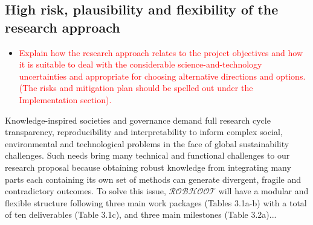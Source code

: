 \documentclass[11pt, a4paper]{article} %
\begin{document}

\subsection{High risk, plausibility and flexibility of the research approach}


\begin{itemize}
\item \textcolor{red}{Explain how the research approach relates to the
    project objectives and how it is suitable to deal with the
    considerable science-and-technology uncertainties and appropriate
    for choosing alternative directions and options. (The risks and
    mitigation plan should be spelled out under the Implementation
    section).}
\end{itemize}

Knowledge-inspired societies and governance demand full research cycle
transparency, reproducibility and interpretability to inform complex
social, environmental and technological problems in the face of global
sustainability challenges. Such needs bring many technical and
functional challenges to our research proposal because obtaining
robust knowledge from integrating many parts each containing its own
set of methods can generate divergent, fragile and contradictory
outcomes. To solve this issue, {\bf $\mathcal{ROBHOOT}$} will have a
modular and flexible structure following three main work packages
(Tables 3.1a-b) with a total of ten deliverables (Table 3.1c), and
three main milestones (Table 3.2a)...
\end{document}
